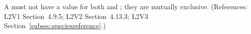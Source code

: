 A \SpeciesReference must not have a value for both 
and ; they are mutually exclusive.  (References:
L2V1 Section~4.9.5; L2V2 Section~4.13.3; L2V3 Section~\ref{subsec:speciesreference}.)
